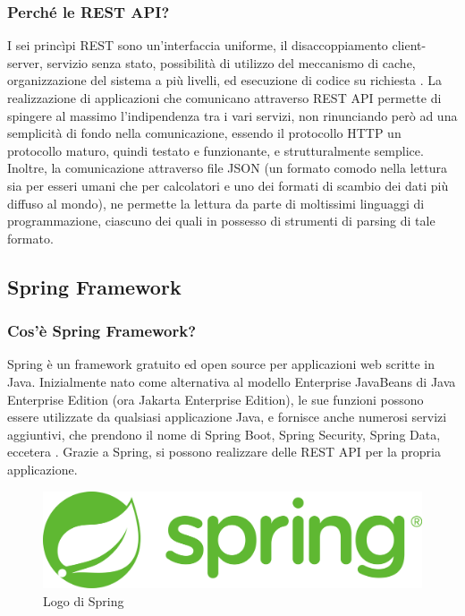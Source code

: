             \subsubsection{Perché le REST API?}
                I sei princìpi REST sono un'interfaccia uniforme, il disaccoppiamento client-server, servizio senza stato, possibilità di utilizzo del meccanismo di cache, organizzazione del sistema a più livelli, ed esecuzione di codice su richiesta \cite{IBM1}. La realizzazione di applicazioni che comunicano attraverso REST API permette di spingere al massimo l'indipendenza tra i vari servizi, non rinunciando però ad una semplicità di fondo nella comunicazione, essendo il protocollo HTTP un protocollo maturo, quindi testato e funzionante, e strutturalmente semplice. Inoltre, la comunicazione attraverso file JSON (un formato comodo nella lettura sia per esseri umani che per calcolatori e uno dei formati di scambio dei dati più diffuso al mondo), ne permette la lettura da parte di moltissimi linguaggi di programmazione, ciascuno dei quali in possesso di strumenti di parsing di tale formato.
                
        \subsection{Spring Framework}
            \subsubsection{Cos'è Spring Framework?}
                Spring è un framework gratuito ed open source per applicazioni web scritte in Java. Inizialmente nato come alternativa al modello Enterprise JavaBeans di Java Enterprise Edition (ora Jakarta Enterprise Edition), le sue funzioni possono essere utilizzate da qualsiasi applicazione Java, e fornisce anche numerosi servizi aggiuntivi, che prendono il nome di Spring Boot, Spring Security, Spring Data, eccetera \cite{Wikipedia4}. Grazie a Spring, si possono realizzare delle REST API per la propria applicazione.
            \begin{figure}[htbp!]
                \centering
                \includegraphics[width=0.5\linewidth]{Immagini/System Design/Spring.png}
                \caption{Logo di Spring}
            \end{figure}
